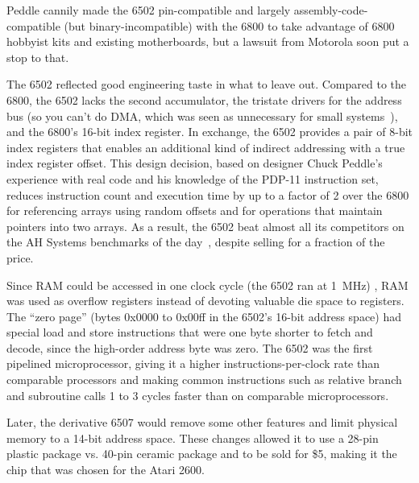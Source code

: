 \begin{tangent}
  Peddle cannily made the 6502 pin-compatible and largely
  assembly-code-compatible (but 
  binary-incompatible) with the 6800 to take advantage of 
  6800 hobbyist kits and existing motherboards, but a lawsuit from
  Motorola soon put a stop to that.
\end{tangent}




\begin{tangent}
    The 6502 reflected good engineering taste in what to leave out.
    Compared to the 6800, the 6502 lacks the second accumulator, the
    tristate drivers for the address bus (so you can't do DMA, which was seen as
    unnecessary for small systems~\cite{byte75:6502}), 
    and the 6800's 16-bit index register.  In exchange, the 6502 provides a pair
    of 8-bit index registers that enables an additional kind of
    indirect addressing with a true index register offset.
    This design decision, based on designer Chuck Peddle's experience with real
    code and his knowledge of the PDP-11 instruction set, 
    reduces instruction count and execution time by up to a
    factor of 2 over the 6800 for referencing arrays using random
    offsets and for operations that
    maintain pointers into two arrays.
    As a result, the 6502
    beat almost all its competitors on  the AH Systems benchmarks of
    the day~\cite{edn75:6502}, despite selling for a fraction of the price.

    Since RAM could be accessed in one
    clock cycle (the 6502 ran at
    1~MHz) , RAM was used as overflow registers instead of devoting valuable die
    space to registers.  The ``zero
    page'' (bytes 0x0000 to 0x00ff in the 6502's 16-bit address space) had
    special load and store instructions that were one byte shorter to fetch and
    decode, since the high-order address byte was zero.
    The 6502 was the first pipelined
    microprocessor, giving it a higher instructions-per-clock 
    rate than comparable processors and making
    common instructions such as relative
    branch and subroutine calls 1 to 3 cycles faster than
    on comparable microprocessors.  

    Later, the derivative 6507 would
    remove some other features and limit
    physical memory to a 14-bit address space.  These changes allowed it to
    use a 28-pin 
    plastic package vs. 40-pin ceramic package and to be sold for \$5,
    making it the chip that was chosen for the Atari 2600.
\end{tangent}

